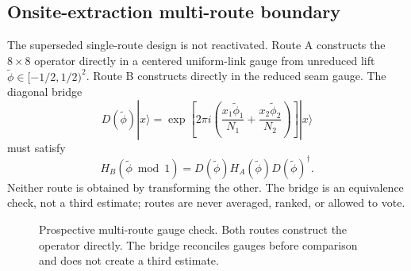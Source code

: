 \documentclass[11pt]{article}
\begin{document}
\subsection{Onsite-extraction multi-route boundary}

The superseded single-route design is not reactivated.  Route A constructs the
$8\times8$ operator directly in a centered uniform-link gauge from unreduced lift
$\widetilde\phi\in[-1/2,1/2)^2$.  Route B constructs directly in the reduced seam gauge.
The diagonal bridge
\begin{equation}
  D(\widetilde\phi)|x\rangle=
  \exp\!\left[2\pi i\left(
    \frac{x_1\widetilde\phi_1}{N_1}+
    \frac{x_2\widetilde\phi_2}{N_2}
  \right)\right]|x\rangle
\end{equation}
must satisfy
\begin{equation}
  H_B(\widetilde\phi\bmod1)=
  D(\widetilde\phi)H_A(\widetilde\phi)D(\widetilde\phi)^\dagger.
\end{equation}
Neither route is obtained by transforming the other.  The bridge is an equivalence
check, not a third estimate; routes are never averaged, ranked, or allowed to vote.

\begin{figure}[htbp]
  \centering
  \caption{Prospective multi-route gauge check.  Both routes construct the operator
  directly.  The bridge reconciles gauges before comparison and does not create a
  third estimate.}
  \label{fig:multi-route-gauge-schematic}
\end{figure}
\end{document}
